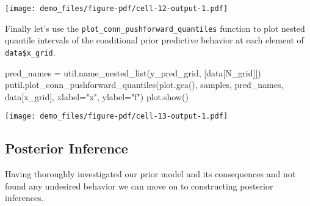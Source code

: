 \documentclass[
  letterpaper,
  DIV=11,
  numbers=noendperiod]{scrartcl}
\newenvironment{Shaded}{\begin{snugshade}}{\end{snugshade}}
\newcommand{\NormalTok}[1]{\textcolor[rgb]{0.00,0.23,0.31}{#1}}
\newcommand{\OperatorTok}[1]{\textcolor[rgb]{0.37,0.37,0.37}{#1}}
\newcommand{\StringTok}[1]{\textcolor[rgb]{0.13,0.47,0.30}{#1}}
\begin{document}
\texttt{[image: demo\_files/figure-pdf/cell-12-output-1.pdf]}

Finally let's use the \texttt{plot\_conn\_pushforward\_quantiles}
function to plot nested quantile intervals of the conditional prior
predictive behavior at each element of \texttt{data\$x\_grid}.

\begin{Shaded}
\begin{Highlighting}[]
\NormalTok{pred\_names }\OperatorTok{=}\NormalTok{ util.name\_nested\_list(}\StringTok{\textquotesingle{}y\_pred\_grid\textquotesingle{}}\NormalTok{, [data[}\StringTok{\textquotesingle{}N\_grid\textquotesingle{}}\NormalTok{]])}
\NormalTok{putil.plot\_conn\_pushforward\_quantiles(plot.gca(), samples,}
\NormalTok{                                      pred\_names, data[}\StringTok{\textquotesingle{}x\_grid\textquotesingle{}}\NormalTok{],}
\NormalTok{                                      xlabel}\OperatorTok{=}\StringTok{"x"}\NormalTok{, ylabel}\OperatorTok{=}\StringTok{"f"}\NormalTok{)}
\NormalTok{plot.show()}
\end{Highlighting}
\end{Shaded}

\texttt{[image: demo\_files/figure-pdf/cell-13-output-1.pdf]}

\subsection{Posterior Inference}\label{posterior-inference}

Having thoroughly investigated our prior model and its consequences and
not found any undesired behavior we can move on to constructing
posterior inferences.
\end{document}
